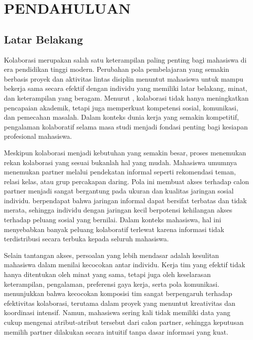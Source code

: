 \chapter{PENDAHULUAN}
\label{chap:pendahuluan}
\section{Latar Belakang}
Kolaborasi merupakan salah satu keterampilan paling penting bagi mahasiswa di era pendidikan tinggi modern. Perubahan pola pembelajaran yang semakin berbasis proyek dan aktivitas lintas disiplin menuntut mahasiswa untuk mampu bekerja sama secara efektif dengan individu yang memiliki latar belakang, minat, dan keterampilan yang beragam. Menurut \textcite{laalBenefitsCollaborativeLearning2012a}, kolaborasi tidak hanya meningkatkan pencapaian akademik, tetapi juga memperkuat kompetensi sosial, komunikasi, dan pemecahan masalah. Dalam konteks dunia kerja yang semakin kompetitif, pengalaman kolaboratif selama masa studi menjadi fondasi penting bagi kesiapan profesional mahasiswa.

Meskipun kolaborasi menjadi kebutuhan yang semakin besar, proses menemukan rekan kolaborasi yang sesuai bukanlah hal yang mudah. Mahasiswa umumnya menemukan partner melalui pendekatan informal seperti rekomendasi teman, relasi kelas, atau grup percakapan daring. Pola ini membuat akses terhadap calon partner menjadi sangat bergantung pada ukuran dan kualitas jaringan sosial individu. \Textcite{granovetterStrengthWeakTies1983} berpendapat bahwa jaringan informal dapat bersifat terbatas dan tidak merata, sehingga individu dengan jaringan kecil berpotensi kehilangan akses terhadap peluang sosial yang bernilai. Dalam konteks mahasiswa, hal ini menyebabkan banyak peluang kolaboratif terlewat karena informasi tidak terdistribusi secara terbuka kepada seluruh mahasiswa.

Selain tantangan akses, persoalan yang lebih mendasar adalah kesulitan mahasiswa dalam menilai kecocokan antar individu. Kerja tim yang efektif tidak hanya ditentukan oleh minat yang sama, tetapi juga oleh keselarasan keterampilan, pengalaman, preferensi gaya kerja, serta pola komunikasi. \textcite{mathieuTeamEffectiveness199720072008} menunjukkan bahwa kecocokan komposisi tim sangat berpengaruh terhadap efektivitas kolaborasi, terutama dalam proyek yang menuntut kreativitas dan koordinasi intensif. Namun, mahasiswa sering kali tidak memiliki data yang cukup mengenai atribut-atribut tersebut dari calon partner, sehingga keputusan memilih partner dilakukan secara intuitif tanpa dasar informasi yang kuat.

